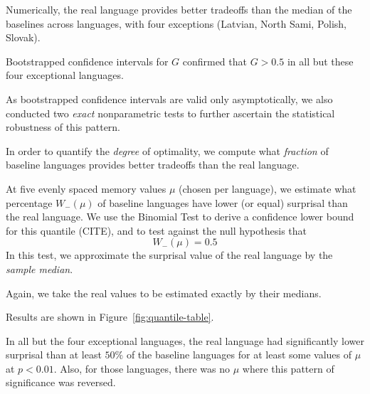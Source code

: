 Numerically, the real language provides better tradeoffs than the median of the baselines across languages, with four exceptions (Latvian, North Sami, Polish, Slovak).

Bootstrapped confidence intervals for $G$ confirmed that $G>0.5$ in all but these four exceptional languages.

As bootstrapped confidence intervals are valid only asymptotically, we also conducted two \emph{exact} nonparametric tests to further ascertain the statistical robustness of this pattern.


In order to quantify the \emph{degree} of optimality, we compute what \emph{fraction} of baseline languages provides better tradeoffs than the real language.

At five evenly spaced memory values $\mu$ (chosen per language), we estimate what percentage $W_-(\mu)$ of baseline languages have lower (or equal) surprisal than the real language.
We use the Binomial Test to derive a confidence lower bound for this quantile (CITE), and to test against the null hypothesis that
\begin{equation}
	W_-(\mu) = 0.5
\end{equation}
In this test, we approximate the surprisal value of the real language by the \emph{sample median}.

Again, we take the real values to be estimated exactly by their medians.

Results are shown in Figure~\ref{fig:quantile-table}.


In all but the four exceptional languages, the real language had significantly lower surprisal than at least $50\%$ of the baseline languages for at least some values of $\mu$ at $p < 0.01$.
Also, for those languages, there was no $\mu$ where this pattern of significance was reversed.



